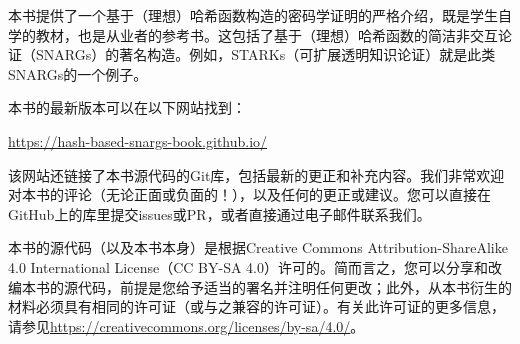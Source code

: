 \documentclass[american,singlepageview]{snargs-book-zh}
\begin{document}
本书提供了一个基于（理想）哈希函数构造的密码学证明的严格介绍，既是学生自学的教材，也是从业者的参考书。这包括了基于（理想）哈希函数的简洁非交互论证（SNARGs）的著名构造。例如，STARKs（可扩展透明知识论证）就是此类SNARGs的一个例子。

本书的最新版本可以在以下网站找到：
\begin{center}
\url{https://hash-based-snargs-book.github.io/}
\end{center}
该网站还链接了本书源代码的Git库，包括最新的更正和补充内容。我们非常欢迎对本书的评论（无论正面或负面的！），以及任何的更正或建议。您可以直接在GitHub上的库里提交issues或PR，或者直接通过电子邮件联系我们。

本书的源代码（以及本书本身）是根据\textsf{Creative Commons Attribution-ShareAlike 4.0 International License}（CC BY-SA 4.0）许可的。简而言之，您可以分享和改编本书的源代码，前提是您给予适当的署名并注明任何更改；此外，从本书衍生的材料必须具有相同的许可证（或与之兼容的许可证）。有关此许可证的更多信息，请参见\url{https://creativecommons.org/licenses/by-sa/4.0/}。

\cleardoublepage
\printbibliography
\end{document}
